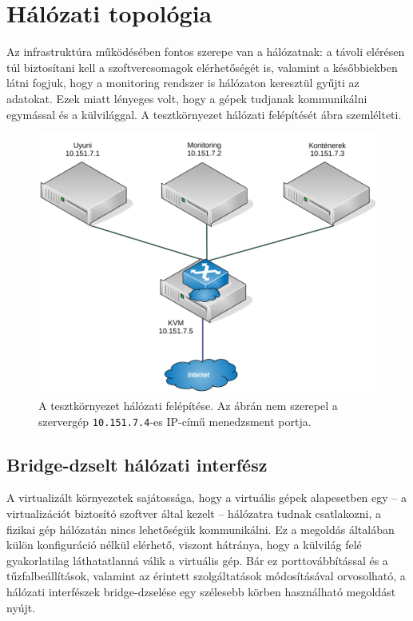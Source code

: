 \section{Hálózati topológia}
Az infrastruktúra működésében fontos szerepe van a hálózatnak: a távoli elérésen túl biztosítani kell a szoftvercsomagok elérhetőségét is, valamint a későbbiekben látni fogjuk, hogy a monitoring rendszer is hálózaton keresztül gyűjti az adatokat. Ezek miatt lényeges volt, hogy a gépek tudjanak kommunikálni egymással és a külvilággal. A tesztkörnyezet hálózati felépítését  ábra szemlélteti.

\begin{figure}[ht]
	\centering
	\includegraphics[width=15cm]{figures/halozat.pdf}
	\caption{A tesztkörnyezet hálózati felépítése. Az ábrán nem szerepel a szervergép \texttt{10.151.7.4}-es IP-című menedzsment portja.}
	\label{fig:test-env-network}
\end{figure}

\subsection{Bridge-dzselt hálózati interfész}
\label{sect:net-bridge}
A virtualizált környezetek sajátossága, hogy a virtuális gépek alapesetben egy -- a virtualizációt biztosító szoftver által kezelt -- hálózatra tudnak csatlakozni, a fizikai gép hálózatán nincs lehetőségük kommunikálni. Ez a megoldás általában külön konfiguráció nélkül elérhető, viszont hátránya, hogy a külvilág felé gyakorlatilag láthatatlanná válik a virtuális gép. Bár ez porttovábbítással és a tűzfalbeállítások, valamint az érintett szolgáltatások módosításával orvosolható, a hálózati interfészek bridge-dzselése egy szélesebb körben használható megoldást nyújt.

